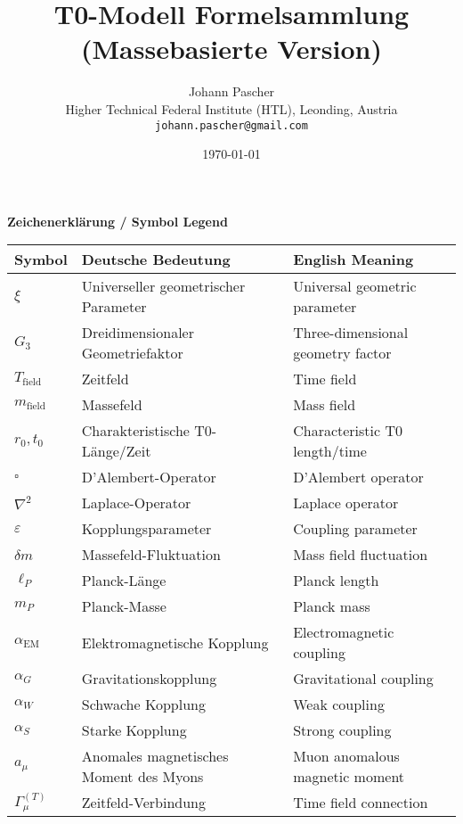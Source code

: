 \documentclass[12pt,a4paper]{article}
\title{T0-Modell Formelsammlung\\
	\large (Massebasierte Version)}
\author{Johann Pascher\\
	\small Higher Technical Federal Institute (HTL), Leonding, Austria\\
	\small \texttt{johann.pascher@gmail.com}}
\date{\today}
\begin{document}
	
	\maketitle
	
	\begin{center}
		\Large \textbf{Zeichenerklärung / Symbol Legend}
	\end{center}
	
	\begin{longtable}{|p{}|p{}|p{}|}
		\hline
		\textbf{Symbol} & \textbf{Deutsche Bedeutung} & \textbf{English Meaning} \\
		\hline
		$\xi$ & Universeller geometrischer Parameter & Universal geometric parameter \\
		\hline
		$G_3$ & Dreidimensionaler Geometriefaktor & Three-dimensional geometry factor \\
		\hline
		$T_{\text{field}}$ & Zeitfeld & Time field \\
		\hline
		$m_{\text{field}}$ & Massefeld & Mass field \\
		\hline
		$r_0, t_0$ & Charakteristische T0-Länge/Zeit & Characteristic T0 length/time \\
		\hline
		$\square$ & D'Alembert-Operator & D'Alembert operator \\
		\hline
		$\nabla^2$ & Laplace-Operator & Laplace operator \\
		\hline
		$\varepsilon$ & Kopplungsparameter & Coupling parameter \\
		\hline
		$\delta m$ & Massefeld-Fluktuation & Mass field fluctuation \\
		\hline
		$\ell_P$ & Planck-Länge & Planck length \\
		\hline
		$m_P$ & Planck-Masse & Planck mass \\
		\hline
		$\alpha_{\text{EM}}$ & Elektromagnetische Kopplung & Electromagnetic coupling \\
		\hline
		$\alpha_G$ & Gravitationskopplung & Gravitational coupling \\
		\hline
		$\alpha_W$ & Schwache Kopplung & Weak coupling \\
		\hline
		$\alpha_S$ & Starke Kopplung & Strong coupling \\
		\hline
		$a_\mu$ & Anomales magnetisches Moment des Myons & Muon anomalous magnetic moment \\
		\hline
		$\Gamma_\mu^{(T)}$ & Zeitfeld-Verbindung & Time field connection \\

\end{longtable}
\end{document}
